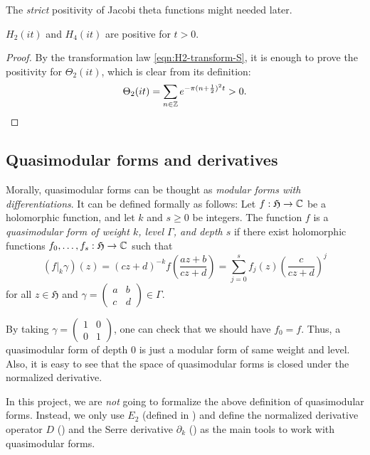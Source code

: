 The \emph{strict} positivity of Jacobi theta functions might needed later.
\begin{corollary}\label{cor:theta-pos}
$H_2(it)$ and $H_4(it)$ are positive for $t > 0$.
\end{corollary}
\begin{proof}\leanok
By the transformation law \eqref{eqn:H2-transform-S}, it is enough to prove the positivity for $\Theta_2(it)$, which is clear from its definition:
\begin{equation}
    \Theta_{2}(it) = \sum_{n \in \mathbb{Z}} e^{- \pi (n + \frac{1}{2})^{2} t} > 0.
\end{equation}
\end{proof}

\subsection{Quasimodular forms and derivatives}

Morally, quasimodular forms can be thought as \emph{modular forms with differentiations}.
It can be defined formally as follows:
Let $f: \mathfrak{H} \to \mathbb{C}$ be a holomorphic function, and let $k$ and $s \ge 0$ be integers.
The function $f$ is a \emph{quasimodular form of weight $k$, level $\Gamma$, and depth $s$} if there exist holomorphic functions $f_0, \dots, f_s : \mathfrak{H} \to \mathbb{C}$ such that
\begin{equation}\label{eqn:quasimod-def}
    (f|_{k}\gamma)(z) = (cz + d)^{-k} f\left(\frac{az + b}{cz + d}\right) = \sum_{j=0}^{s} f_j(z) \left(\frac{c}{cz + d}\right)^j
\end{equation}
for all $z \in \mathfrak{H}$ and $\gamma = \left(\begin{smallmatrix} a&b\\c&d \end{smallmatrix}\right) \in \Gamma$.

By taking $\gamma = \left(\begin{smallmatrix} 1 & 0 \\ 0 & 1 \end{smallmatrix}\right)$, one can check that we should have $f_0 = f$. Thus, a quasimodular form of depth $0$ is just a modular form of same weight and level.
Also, it is easy to see that the space of quasimodular forms is closed under the normalized derivative.

In this project, we are \emph{not} going to formalize the above definition of quasimodular forms.
Instead, we only use $E_2$ (defined in ) and define the normalized derivative operator $D$ () and the Serre derivative $\partial_k$ () as the main tools to work with quasimodular forms.

